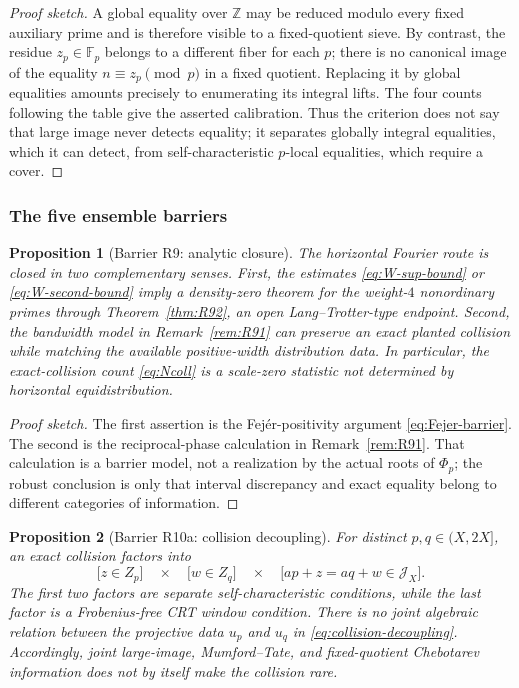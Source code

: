\documentclass[11pt]{amsart}
\theoremstyle{plain}
\newtheorem{proposition}{Proposition}
\theoremstyle{remark}
\begin{document}
\begin{proof}[Proof sketch]
A global equality over $\mathbb Z$ may be reduced modulo every fixed
auxiliary prime and is therefore visible to a fixed-quotient sieve.
By contrast, the residue $z_p\in\mathbb F_p$ belongs to a different
fiber for each $p$; there is no canonical image of the equality
$n\equiv z_p\pmod p$ in a fixed quotient.  Replacing it by global
equalities amounts precisely to enumerating its integral lifts.  The
four counts following the table give the asserted calibration.  Thus
the criterion does not say that large image never detects equality;
it separates globally integral equalities, which it can detect, from
self-characteristic $p$-local equalities, which require a cover.
\end{proof}

\subsubsection{The five ensemble barriers}

\begin{proposition}[Barrier R9: analytic closure]
\label{prop:barrier-analytic}
The horizontal Fourier route is closed in two complementary senses.
First, the estimates \eqref{eq:W-sup-bound} or
\eqref{eq:W-second-bound} imply a density-zero theorem for the
weight-$4$ nonordinary primes through Theorem~\ref{thm:R92}, an open
Lang--Trotter-type endpoint.  Second, the bandwidth model in
Remark~\ref{rem:R91} can preserve an exact planted collision while
matching the available positive-width distribution data.  In
particular, the exact-collision count \eqref{eq:Ncoll} is a scale-zero
statistic not determined by horizontal equidistribution.
\end{proposition}

\begin{proof}[Proof sketch]
The first assertion is the Fej\'er-positivity argument
\eqref{eq:Fejer-barrier}.  The second is the reciprocal-phase
calculation in Remark~\ref{rem:R91}.  That calculation is a barrier
model, not a realization by the actual roots of $\Phi_p$; the robust
conclusion is only that interval discrepancy and exact equality belong
to different categories of information.
\end{proof}

\begin{proposition}[Barrier R10a: collision decoupling]
\label{prop:collision-decoupling}
For distinct $p,q\in(X,2X]$, an exact collision factors into
\[
 \bigl[z\in Z_p\bigr]\quad\times\quad
 \bigl[w\in Z_q\bigr]\quad\times\quad
 \bigl[ap+z=aq+w\in\mathcal J_X\bigr].
 \tag{8.9}\label{eq:collision-decoupling}
\]
The first two factors are separate self-characteristic conditions,
while the last factor is a Frobenius-free CRT window condition.  There
is no joint algebraic relation between the projective data $u_p$ and
$u_q$ in \eqref{eq:collision-decoupling}.  Accordingly, joint
large-image, Mumford--Tate, and fixed-quotient Chebotarev information
does not by itself make the collision rare.
\end{proposition}
\end{document}
